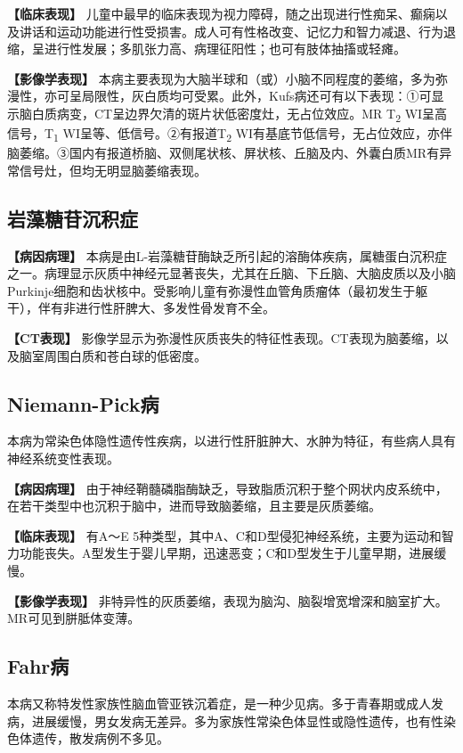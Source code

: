 \textbf{【临床表现】}
儿童中最早的临床表现为视力障碍，随之出现进行性痴呆、癫痫以及讲话和运动功能进行性受损害。成人可有性格改变、记忆力和智力减退、行为退缩，呈进行性发展；多肌张力高、病理征阳性；也可有肢体抽搐或轻瘫。

\textbf{【影像学表现】}
本病主要表现为大脑半球和（或）小脑不同程度的萎缩，多为弥漫性，亦可呈局限性，灰白质均可受累。此外，Kufs病还可有以下表现：①可显示脑白质病变，CT呈边界欠清的斑片状低密度灶，无占位效应。MR
T\textsubscript{2} WI呈高信号，T\textsubscript{1}
WI呈等、低信号。②有报道T\textsubscript{2}
WI有基底节低信号，无占位效应，亦伴脑萎缩。③国内有报道桥脑、双侧尾状核、屏状核、丘脑及内、外囊白质MR有异常信号灶，但均无明显脑萎缩表现。

\subsection{岩藻糖苷沉积症}

\textbf{【病因病理】}
本病是由L-岩藻糖苷酶缺乏所引起的溶酶体疾病，属糖蛋白沉积症之一。病理显示灰质中神经元显著丧失，尤其在丘脑、下丘脑、大脑皮质以及小脑Purkinje细胞和齿状核中。受影响儿童有弥漫性血管角质瘤体（最初发生于躯干），伴有非进行性肝脾大、多发性骨发育不全。

\textbf{【CT表现】}
影像学显示为弥漫性灰质丧失的特征性表现。CT表现为脑萎缩，以及脑室周围白质和苍白球的低密度。

\subsection{Niemann-Pick病}

本病为常染色体隐性遗传性疾病，以进行性肝脏肿大、水肿为特征，有些病人具有神经系统变性表现。

\textbf{【病因病理】}
由于神经鞘髓磷脂酶缺乏，导致脂质沉积于整个网状内皮系统中，在若干类型中也沉积于脑中，进而导致脑萎缩，且主要是灰质萎缩。

\textbf{【临床表现】} 有A～E
5种类型，其中A、C和D型侵犯神经系统，主要为运动和智力功能丧失。A型发生于婴儿早期，迅速恶变；C和D型发生于儿童早期，进展缓慢。

\textbf{【影像学表现】}
非特异性的灰质萎缩，表现为脑沟、脑裂增宽增深和脑室扩大。MR可见到胼胝体变薄。

\subsection{Fahr病}

本病又称特发性家族性脑血管亚铁沉着症，是一种少见病。多于青春期或成人发病，进展缓慢，男女发病无差异。多为家族性常染色体显性或隐性遗传，也有性染色体遗传，散发病例不多见。

